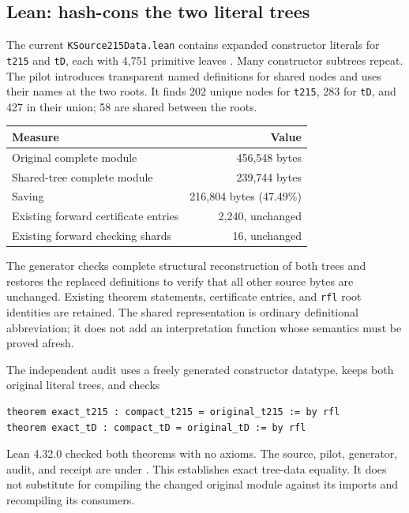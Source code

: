 \documentclass[11pt]{article}
\newcommand{\artifact}[1]{\path{#1}}
\begin{document}
\subsection{Lean: hash-cons the two literal trees}

The current \texttt{KSource215Data.lean} contains expanded constructor literals for \texttt{t215} and \texttt{tD}, each with 4,751 primitive leaves \cite{source}. Many constructor subtrees repeat. The pilot introduces transparent named definitions for shared nodes and uses their names at the two roots. It finds 202 unique nodes for \texttt{t215}, 283 for \texttt{tD}, and 427 in their union; 58 are shared between the roots.

\begin{center}
\begin{tabular}{@{}lr@{}}
\toprule
Measure & Value \\
\midrule
Original complete module & 456,548 bytes \\
Shared-tree complete module & 239,744 bytes \\
Saving & 216,804 bytes (47.49\%) \\
Existing forward certificate entries & 2,240, unchanged \\
Existing forward checking shards & 16, unchanged \\
\bottomrule
\end{tabular}
\end{center}

The generator checks complete structural reconstruction of both trees and restores the replaced definitions to verify that all other source bytes are unchanged. Existing theorem statements, certificate entries, and \texttt{rfl} root identities are retained. The shared representation is ordinary definitional abbreviation; it does not add an interpretation function whose semantics must be proved afresh.

The independent audit uses a freely generated constructor datatype, keeps both original literal trees, and checks
\begin{lstlisting}
theorem exact_t215 : compact_t215 = original_t215 := by rfl
theorem exact_tD : compact_tD = original_tD := by rfl
\end{lstlisting}
Lean 4.32.0 checked both theorems with no axioms. The source, pilot, generator, audit, and receipt are under \artifact{proof_simplification/}. This establishes exact tree-data equality. It does not substitute for compiling the changed original module against its imports and recompiling its consumers.
\end{document}

